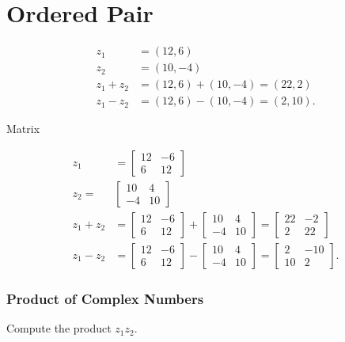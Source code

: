 \section{Ordered Pair}
$$
\begin{aligned}
z_{1} & =(12,6) \\
z_{2} & =(10,-4) \\
z_{1}+z_{2} & =(12,6)+(10,-4)=(22,2) \\
z_{1}-z_{2} & =(12,6)-(10,-4)=(2,10) .
\end{aligned}
$$

Matrix

$$
\begin{aligned}
z_{1} & =\left[\begin{array}{cc}
12 & -6 \\
6 & 12
\end{array}\right] \\
z_{2}= & {\left[\begin{array}{cc}
10 & 4 \\
-4 & 10
\end{array}\right] } \\
z_{1}+z_{2} & =\left[\begin{array}{cc}
12 & -6 \\
6 & 12
\end{array}\right]+\left[\begin{array}{cc}
10 & 4 \\
-4 & 10
\end{array}\right]=\left[\begin{array}{cc}
22 & -2 \\
2 & 22
\end{array}\right] \\
z_{1}-z_{2} & =\left[\begin{array}{cc}
12 & -6 \\
6 & 12
\end{array}\right]-\left[\begin{array}{cc}
10 & 4 \\
-4 & 10
\end{array}\right]=\left[\begin{array}{cc}
2 & -10 \\
10 & 2
\end{array}\right] .
\end{aligned}
$$

\subsubsection{Product of Complex Numbers}
Compute the product $z_{1} z_{2}$.


